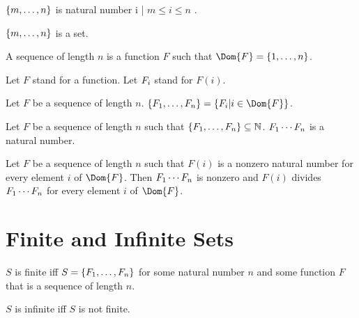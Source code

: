 \documentclass[11pt]{article}
\begin{document}
\begin{forthel}
\begin{definition}
  $\{m,\dots,n\}$ is { natural number i | $ m \leq i \leq n $ }.
\end{definition}

\begin{axiom} $\{m,\dots,n\}$ is a set. \end{axiom}

\begin{definition} A sequence of length $n$ is a
function $F$ such that $\Dom{F} = \Seq{1}{n}$.
\end{definition}

Let $F$ stand for a function.
Let $F_{i}$ stand for $F(i)$.

\begin{definition} Let $F$ be a sequence of length $n$.
$\Set{F}{1}{n} = \{ \val{F}{i} | i \in \Dom{F}\}$.
\end{definition}

\begin{signature} Let $F$ be a sequence of length $n$
such that $\{F_{1},\dots,F_{n}\} \subseteq \mathbb{N}$.
$F_{1} \cdots F_{n}$ is a natural number.
\end{signature}

\begin{axiom}[Factorproperty] Let $F$ be a sequence of length $n$
such that $F(i)$ is a nonzero natural number for every element $i$ of $\Dom{F}$.
Then $F_{1} \cdots F_{n}$ is nonzero and 
$F(i)$ divides $F_{1} \cdots F_{n}$ for every element $i$ of $\Dom{F}$.
\end{axiom}


\end{forthel}

\section{Finite and Infinite Sets}

\begin{forthel}

\begin{definition} $S$ is finite iff 
$S = \{F_{1},\dots,F_{n}\}$ for some natural number $n$ and some function $F$ that is 
a sequence of length $n$.
\end{definition}

\begin{definition} $S$ is infinite iff $S$ is not finite.
\end{definition}

\end{forthel}
\end{document}
